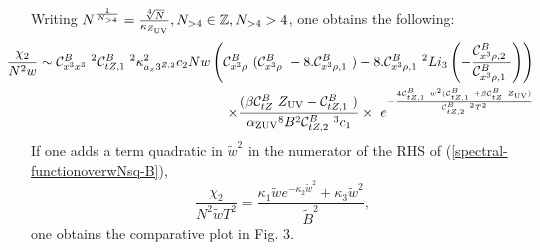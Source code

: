 Writing $N^{\frac{1}{N_{>4} }}=\frac{\sqrt[4]{N}}{{\kappa_{Z_{\rm UV}}}}, N_{>4} \in\mathbb{Z}, N_{>4} >4$,
one obtains the following:
\begin{eqnarray}
\label{spectral-functionoverwNsq-B}
& & \hskip -0.4in \frac{{\chi_2}}{N^2  w}\sim {\cal C}_{x^3x^3}^B\ ^2 {\cal C}_{tZ,1}^B\ ^2
   \kappa_{a_x3^{Z,2}}^2 c_2 N w
   \left({\cal C}_{x^3\rho}^B\ 
   ({\cal C}_{x^3\rho}^B\ -8. {\cal C}_{x^3\rho,1}^B\ )-8. {\cal C}_{x^3\rho,1}^B\ ^2
   {Li}_3\left(-\frac{{\cal C}_{x^3\rho,2}^B\ }{{\cal C}_{x^3\rho,1}^B\ }\right)\right) \nonumber \\ 
& & \times \frac{(\beta  {\cal C}_{tZ}^B\ 
   {Z_{\rm UV}}-{\cal C}_{tZ,1}^B\ ) }{{\alpha_{\rm ZUV}}^8 B^2 {\cal C}_{tZ,2}^B\ ^3
   c_1}\times \ e^{-\frac{4
   {\cal C}_{tZ,1}^B\  w^2 ({\cal C}_{tZ,1}^B\ +\beta 
   {\cal C}_{tZ}^B\ 
   {Z_{\rm UV}})}{{\cal C}_{tZ,2}^B\ ^2
   T^2}}   
\end{eqnarray} 
If one adds a term quadratic in $\tilde{w}^2$ in the numerator of the RHS of (\ref{spectral-functionoverwNsq-B}),
\begin{equation}
\label{extra-term-chi-over-wtilde}
\frac{{\chi_2}}{N^2  \tilde{w} T^2} = \frac{\kappa_1 \tilde{w} e^{-\kappa_2 \tilde{w}^2} + \kappa_3 \tilde{w}^2}{\tilde{B}^2},
\end{equation}
one obtains the comparative plot in Fig. {3}.

